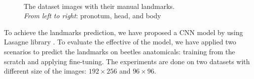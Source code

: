 \documentclass[12pt,a4paper]{article}
\begin{document}
\begin{figure}[h!]
\centering
{}~~
~~
\caption{The dataset images with their manual landmarks.\\
		 \textit{From left to right}: pronotum, head, and body}
\label{figintro}
\end{figure}

To achieve the landmarks prediction, we have proposed a CNN model \cite{lecun2010convolutional} by using Lasagne library \cite{lasagne}. To evaluate the effective of the model, we have applied two scenarios to predict the landmarks on beetles anatomicals: training from the scratch and applying fine-tuning. The experiments are done on two datasets with different size of the images: $192 \times 256$ and $96 \times 96$.
\end{document}
